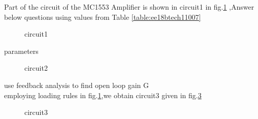 \begin{enumerate}[label=\thesubsection.\arabic*.,ref=\thesubsection.\theenumi]
{\small
 \item Part of the circuit of the MC1553 Amplifier is shown in circuit1 in  fig.\ref{fig:circuit1} ,Answer below questions using values from Table \ref{table:ee18btech11007}
 \begin{figure}[!ht]
	\begin{center}
		
		\resizebox{\columnwidth}{!}{}
	\end{center}
\caption{circuit1}
\label{fig:circuit1}
\end{figure}
 
\begin{table}[!ht]
\centering

\caption{parameters}
\label{table:ee18btech11007}
\end{table}
\begin{figure}[!ht]
	\begin{center}
		
		\resizebox{\columnwidth}{!}{}
	\end{center}
\caption{circuit2}
\label{fig:circuit2}
\end{figure}
\item use feedback analysis to find open loop gain G 
\\
\solution employing loading rules in fig.\ref{fig:circuit1},we obtain circuit3 given in fig.\ref{fig:circuit3}
 \begin{figure}[!ht]
	\begin{center}
		
		\resizebox{\columnwidth}{!}{}
	\end{center}
\caption{circuit3}
\label{fig:circuit3}
\end{figure}
\begin{figure}[!ht]
	\begin{center}
		

\end{center}
\end{figure}}
\end{enumerate}
